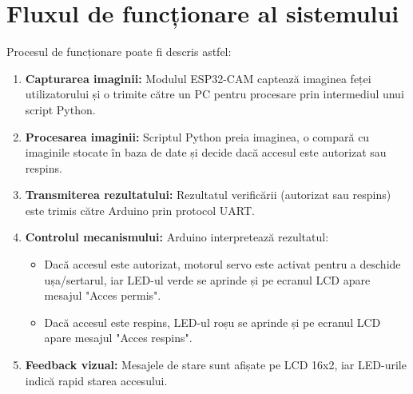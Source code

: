 \documentclass{report}
\begin{document}
\section{Fluxul de funcționare al sistemului}
Procesul de funcționare poate fi descris astfel:
\begin{enumerate}
    \item \textbf{Capturarea imaginii:} Modulul ESP32-CAM captează imaginea feței utilizatorului și o trimite către un PC pentru procesare prin intermediul unui script Python.
    \item \textbf{Procesarea imaginii:} Scriptul Python preia imaginea, o compară cu imaginile stocate în baza de date și decide dacă accesul este autorizat sau respins.
    \item \textbf{Transmiterea rezultatului:} Rezultatul verificării (autorizat sau respins) este trimis către Arduino prin protocol UART.
    \item \textbf{Controlul mecanismului:} Arduino interpretează rezultatul:
    \begin{itemize}
        \item Dacă accesul este autorizat, motorul servo este activat pentru a deschide ușa/sertarul, iar LED-ul verde se aprinde și pe ecranul LCD apare mesajul "Acces permis".
        \item Dacă accesul este respins, LED-ul roșu se aprinde și pe ecranul LCD apare mesajul "Acces respins".
    \end{itemize}
    \item \textbf{Feedback vizual:} Mesajele de stare sunt afișate pe LCD 16x2, iar LED-urile indică rapid starea accesului.
\end{enumerate}
\end{document}
